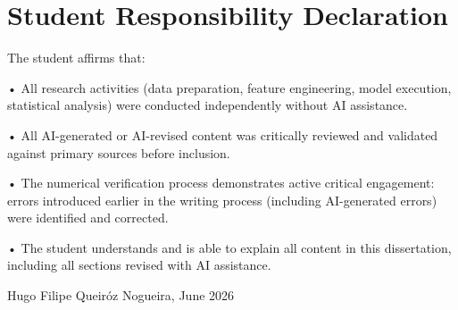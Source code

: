 \section{Student Responsibility Declaration}\label{app_sec:student_responsibility_declaration}

The student affirms that:

•  All research activities (data preparation, feature engineering, model execution, statistical analysis) were conducted independently without AI assistance.

•  All AI-generated or AI-revised content was critically reviewed and validated against primary sources before inclusion.

•  The numerical verification process demonstrates active critical engagement: errors introduced earlier in the writing process (including AI-generated errors) were identified and corrected.

•  The student understands and is able to explain all content in this dissertation, including all sections revised with AI assistance.

\nopagebreak[4]
\vspace{0.5em}
\noindent Hugo Filipe Queir\'oz Nogueira, June 2026
